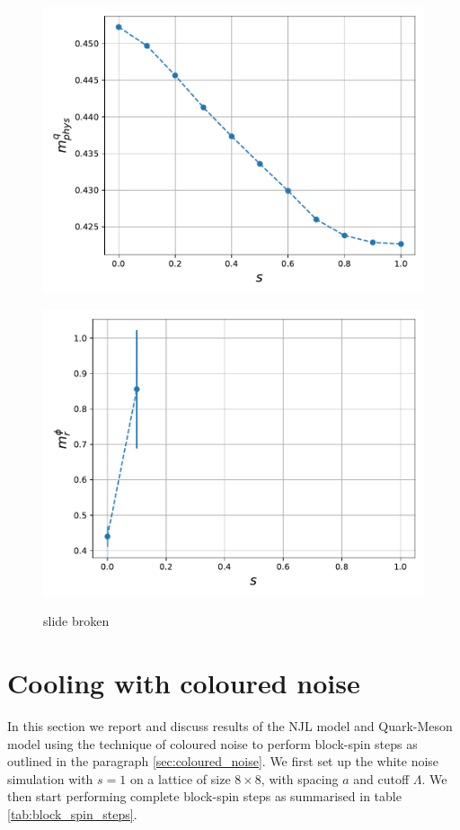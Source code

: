 \begin{figure}
\begin{minipage}{0.45\textwidth}
    \includegraphics[scale=0.52]{figures/slide_broken/mqphys.pdf}
    \label{fig:slide_broken_mqphys}
\end{minipage}
\hfill
\begin{minipage}{0.45\textwidth}
    \includegraphics[scale=0.52]{figures/slide_broken/mphir.pdf}
    \label{fig:slide_broken_mphir}
\end{minipage}
\caption{slide broken}
\label{fig:slide_broken}
\end{figure}



\section{Cooling with coloured noise}
In this section we report and discuss results of the NJL model and Quark-Meson model using the technique of coloured noise to perform block-spin steps as outlined in the paragraph \ref{sec:coloured_noise}. We first set up the white noise simulation with $s=1$ on a lattice of size $8 \times 8$, with spacing $a$ and cutoff $\Lambda$. We then start performing complete block-spin steps as summarised in table \ref{tab:block_spin_steps}. \\

